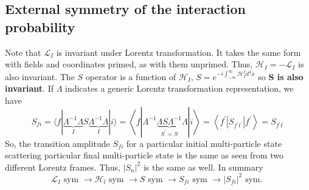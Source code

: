 \subsection{External symmetry of the interaction probability}

Note that $\mathcal{L}_I$ is invariant under Lorentz transformation. It takes the same form with fields and coordinates primed, as with them unprimed. Thus, $\mathcal{H}_I=-\mathcal{L}_I$ is also invariant. The $S$ operator is a function of $\mathcal{H}_I$, $S=e^{-i \int_{-\infty}^{\infty} \mathcal{H}_{I}^{I} d^{4} x}$ so \textbf{S is also invariant}. If $\Lambda$ indicates a generic Lorentz transformation representation, we have
\begin{equation}
S_{f i}=\langle f|\underbrace{\Lambda^{-1} \Lambda}_{I} S \underbrace{\Lambda^{-1} \Lambda}_{I}| i\rangle=\left\langle f\left|\Lambda^{-1} \underbrace{\Lambda S \Lambda^{-1}}_{S^{\prime}=S} \Lambda\right| i\right\rangle=\left\langle f^{\prime}\left|S_{f^{\prime} t^{\prime}}\right| f^{\prime}\right\rangle=S_{f^{\prime} t^{\prime}}
\end{equation}
So, the transition amplitude $S_{f i}$ for a particular initial multi-particle state scattering particular final multi-particle state is the same as seen from two different Lorentz frames. Thus, $\left|S_{n}\right|^{2}$ is the same as well. In summary
$$
\mathcal{L}_{I} \text { sym } \rightarrow \mathcal{H}_{l} \text { sym } \rightarrow S \text { sym } \rightarrow S_{fi} \text { sym } \rightarrow\left|S_{fi}\right|^{2} \text { sym. }
$$

